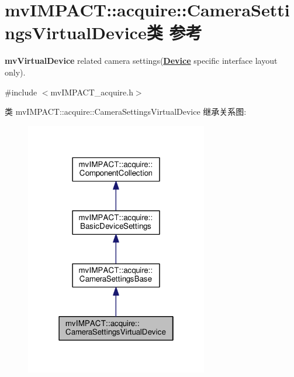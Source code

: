\hypertarget{classmv_i_m_p_a_c_t_1_1acquire_1_1_camera_settings_virtual_device}{\section{mv\+I\+M\+P\+A\+C\+T\+:\+:acquire\+:\+:Camera\+Settings\+Virtual\+Device类 参考}
\label{classmv_i_m_p_a_c_t_1_1acquire_1_1_camera_settings_virtual_device}
}


{\bfseries mv\+Virtual\+Device} related camera settings({\bfseries \hyperlink{classmv_i_m_p_a_c_t_1_1acquire_1_1_device}{Device}} specific interface layout only).  




{\ttfamily \#include $<$mv\+I\+M\+P\+A\+C\+T\+\_\+acquire.\+h$>$}



类 mv\+I\+M\+P\+A\+C\+T\+:\+:acquire\+:\+:Camera\+Settings\+Virtual\+Device 继承关系图\+:
\nopagebreak
\begin{figure}[H]
\begin{center}
\leavevmode
\includegraphics[width=226pt]{classmv_i_m_p_a_c_t_1_1acquire_1_1_camera_settings_virtual_device__inherit__graph}
\end{center}
\end{figure}


